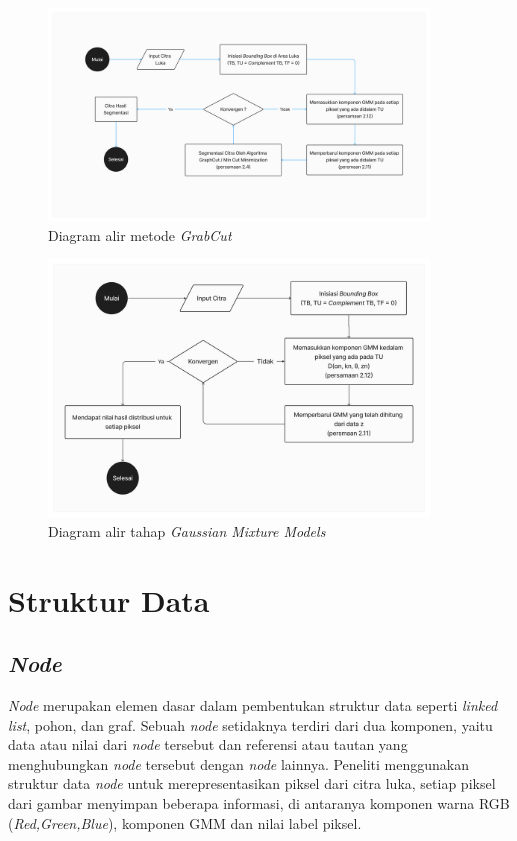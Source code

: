 \begin{figure}[H]
	\centering{}
	\includegraphics[width=0.9\textwidth]{gambar/diagram_grabcut.png}
	\caption{Diagram alir metode \emph{GrabCut}}
  \end{figure}

\begin{figure}[H]
	\centering{}
	\includegraphics[width=0.9\textwidth]{gambar/diagram_gmm.png}
	\caption{Diagram alir tahap \emph{Gaussian Mixture Models}}
  \end{figure}

\section{Struktur Data}

\subsection{\emph{Node}}

\emph{Node} merupakan elemen dasar dalam pembentukan struktur data seperti \emph{linked list},
pohon, dan graf. Sebuah \emph{node} setidaknya terdiri dari dua komponen, yaitu 
data atau nilai dari \emph{node} tersebut dan referensi atau tautan yang menghubungkan 
\emph{node} tersebut dengan \emph{node} lainnya. Peneliti menggunakan struktur data \emph{node} untuk merepresentasikan piksel dari
citra luka, setiap piksel dari gambar menyimpan beberapa informasi, di antaranya komponen warna
RGB (\emph{Red,Green,Blue}), komponen GMM dan nilai label piksel.

